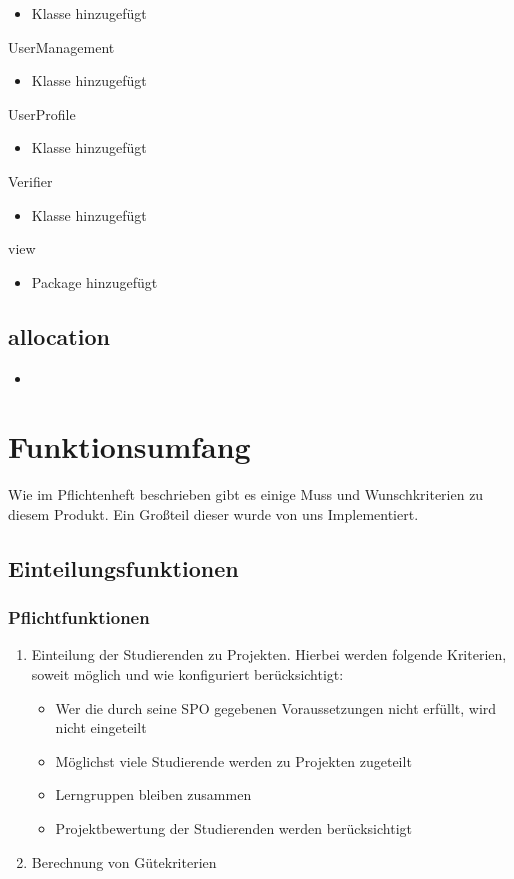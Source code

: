 \documentclass[parskip=full]{scrartcl}
\newcommand{\swtLabel}[1]{\textbf{/#1\arabic*0/}}
\begin{document}
\begin{itemPackage}
\begin{itemClass}
\begin{itemize}
	  \item Klasse hinzugefügt
	\end{itemize}
\item UserManagement
\item \begin{itemize}
	  \item Klasse hinzugefügt
	\end{itemize}
\item UserProfile
\item \begin{itemize}
	  \item Klasse hinzugefügt
	\end{itemize}
\item Verifier
\item \begin{itemize}
	  \item Klasse hinzugefügt
	\end{itemize}
\end{itemClass}
\item view
\begin{itemize}
  \item Package hinzugefügt
\end{itemize}
\end{itemPackage}
\subsection{allocation}
\begin{itemize}
  \item 
\end{itemize}

\section{Funktionsumfang}
Wie im Pflichtenheft beschrieben gibt es einige Muss und Wunschkriterien zu
diesem Produkt. Ein Großteil dieser wurde von uns Implementiert.
\subsection{Einteilungsfunktionen}
\subsubsection{Pflichtfunktionen}
\begin{enumerate}[label=\swtLabel{FA}]
  \item Einteilung der Studierenden zu Projekten. Hierbei werden folgende Kriterien,
soweit möglich und wie konfiguriert berücksichtigt:
\begin{itemize}
  \item Wer die durch seine SPO gegebenen Voraussetzungen nicht erfüllt, wird nicht
eingeteilt
\item Möglichst viele Studierende werden zu Projekten zugeteilt
\item Lerngruppen bleiben zusammen
\item Projektbewertung der Studierenden werden berücksichtigt
\end{itemize}
\item Berechnung von Gütekriterien
\end{enumerate}
\end{document}
